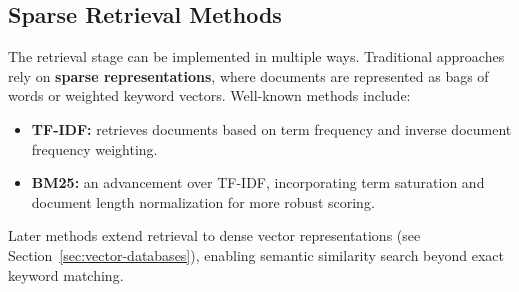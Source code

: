 \subsection{Sparse Retrieval Methods}
The retrieval stage can be implemented in multiple ways. Traditional approaches rely on \textbf{sparse representations}, where documents are represented as bags of words or weighted keyword vectors. Well-known methods include:
\begin{itemize}
    \item \textbf{TF-IDF:} retrieves documents based on term frequency and inverse document frequency weighting.  
    \item \textbf{BM25:} an advancement over TF-IDF, incorporating term saturation and document length normalization for more robust scoring.  
\end{itemize}

Later methods extend retrieval to dense vector representations (see Section~\ref{sec:vector-databases}), enabling semantic similarity search beyond exact keyword matching.

